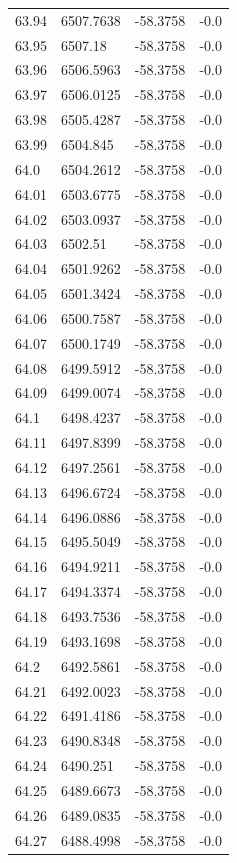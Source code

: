 \begin{table}[H]
\begin{tabular}{llll}
63.94 & 6507.7638 & -58.3758 & -0.0 \\
63.95 & 6507.18 & -58.3758 & -0.0 \\
63.96 & 6506.5963 & -58.3758 & -0.0 \\
63.97 & 6506.0125 & -58.3758 & -0.0 \\
63.98 & 6505.4287 & -58.3758 & -0.0 \\
63.99 & 6504.845 & -58.3758 & -0.0 \\
64.0 & 6504.2612 & -58.3758 & -0.0 \\
64.01 & 6503.6775 & -58.3758 & -0.0 \\
64.02 & 6503.0937 & -58.3758 & -0.0 \\
64.03 & 6502.51 & -58.3758 & -0.0 \\
64.04 & 6501.9262 & -58.3758 & -0.0 \\
64.05 & 6501.3424 & -58.3758 & -0.0 \\
64.06 & 6500.7587 & -58.3758 & -0.0 \\
64.07 & 6500.1749 & -58.3758 & -0.0 \\
64.08 & 6499.5912 & -58.3758 & -0.0 \\
64.09 & 6499.0074 & -58.3758 & -0.0 \\
64.1 & 6498.4237 & -58.3758 & -0.0 \\
64.11 & 6497.8399 & -58.3758 & -0.0 \\
64.12 & 6497.2561 & -58.3758 & -0.0 \\
64.13 & 6496.6724 & -58.3758 & -0.0 \\
64.14 & 6496.0886 & -58.3758 & -0.0 \\
64.15 & 6495.5049 & -58.3758 & -0.0 \\
64.16 & 6494.9211 & -58.3758 & -0.0 \\
64.17 & 6494.3374 & -58.3758 & -0.0 \\
64.18 & 6493.7536 & -58.3758 & -0.0 \\
64.19 & 6493.1698 & -58.3758 & -0.0 \\
64.2 & 6492.5861 & -58.3758 & -0.0 \\
64.21 & 6492.0023 & -58.3758 & -0.0 \\
64.22 & 6491.4186 & -58.3758 & -0.0 \\
64.23 & 6490.8348 & -58.3758 & -0.0 \\
64.24 & 6490.251 & -58.3758 & -0.0 \\
64.25 & 6489.6673 & -58.3758 & -0.0 \\
64.26 & 6489.0835 & -58.3758 & -0.0 \\
64.27 & 6488.4998 & -58.3758 & -0.0 \\

\end{tabular}
\end{table}
